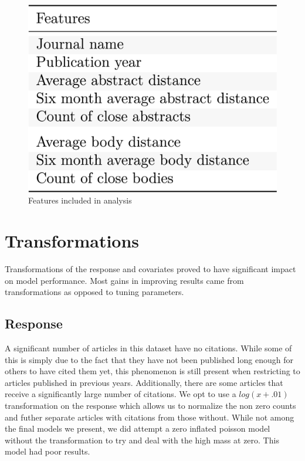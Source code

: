 \documentclass{article} %
\begin{document}
\begin{figure}[h]
\begin{center}
  \includegraphics[scale=0.17]{../figures/features.png}
\end{center}
\caption{Features included in analysis}
\label{features}
\end{figure}

\section{Transformations}

Transformations of the response and covariates proved to have significant impact on model performance. Most gains in improving results came from transformations as opposed to tuning parameters.

\subsection{Response}
A significant number of articles in this dataset have no citations. While some of this is simply due to the fact that they have not been published long enough for others to have cited them yet, this phenomenon is still present when restricting to articles published in previous years. Additionally, there are some articles that receive a significantly large number of citations. We opt to use a $log(x+.01)$ transformation on the response which allows us to normalize the non zero counts and futher separate articles with citations from those without. While not among the final models we present, we did attempt a zero inflated poisson model without the transformation to try and deal with the high mass at zero. This model had poor results.
\end{document}
